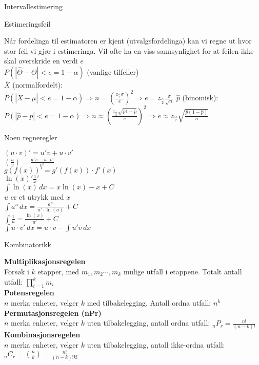 \documentclass[final,hyperref={pdfpagelabels=false}]{beamer}
\newcommand{\body}[1]{\footnotesize\raggedright{#1}\par}
\newcommand{\subsect}[1]{\center\normalsize{#1}\\}
\begin{document}
\begin{frame}{}
\begin{columns}[t]
\begin{column}{.25\linewidth}
\begin{block}{\center Intervallestimering}
{\begin{enumerate}
					\end{enumerate}
				}
				\subsect{Estimeringsfeil}
				\body{Når fordelinga til estimatoren er kjent (utvalgsfordelinga) kan vi regne ut hvor stor feil vi gjør i estimeringa. Vil ofte ha en viss sannsynlighet for at feilen ikke skal overskride en verdi $e$\\
					$P(|\hat\Theta-\Theta|<e=1-\alpha)$ (vanlige tilfeller)\\
					$\bar X$ (normalfordelt):\\
					$P(|\bar X - \mu|<e=1-\alpha) \Rightarrow n=\left( \frac{z_\frac{\alpha}{2}\sigma}{e}\right)^2\Rightarrow e=z_\frac{\alpha}{2}\frac{\sigma}{\sqrt n}$
					$\hat p$ (binomisk):\\
					$P(|\hat p - p| < e=1-\alpha)\Rightarrow n\approx \left(\frac{z_\frac{\alpha}{2}\sqrt{\hat p {1-\hat p}}}{e}\right)^2\Rightarrow e\approx z_\frac{\alpha}{2}\sqrt{\frac{\hat p(1 - \hat p)}{n}}$}
				\subsect{Noen regneregler}
				\body{
					$(u\cdot v)' = u'v + u\cdot v'$\\
					$\left( \frac{u}{v}\right) = \frac{u'v - u\cdot v'}{v^2}$\\
					$g(f(x))'=g'(f(x))\cdot f'(x)$\\
					$\ln(x)'\frac{1}{x}'$\\
					$\int \ln (x) \, dx=x\ln (x) -x + C$ \\
					$u$ er et utrykk med $x$\\
					$\int a^u \, dx = \frac{a^u}{u'\cdot \ln(a)} + C$\\
					$\int \frac{1}{u} = \frac{\ln(x)}{u'} + C$ \\
					$\int u \cdot v' \, dx = u\cdot v-\int u'v \, dx$
				}
				\subsect{Kombinatorikk}
				\body{\textbf{Multiplikasjonsregelen}\\
					Forsøk i $k$ etapper, med $m_1,m_2 \cdots,m_k$ mulige utfall i etappene. Totalt antall utfall: $\prod_{i=1}^k m_i$\\
					\textbf{Potensregelen}\\
					$n$ merka enheter, velger $k$ med tilbakelegging. Antall ordna utfall: $n^k$\\
					\textbf{Permutasjonsregelen (nPr)}\\
					$n$ merka enheter, velger $k$ uten tilbakelegging, antall ordna utfall: $_nP_r=\frac{n!}{(n-k)!}$\\
					\textbf{Kombinasjonsregelen}\\
					$n$ merka enheter, velger $k$ uten tilbakelegging, antall ikke-ordna utfall: $_nC_r=\binom{n}{k}=\frac{n!}{(n-k)!k!}$\\}

\end{block}
\end{column}
\end{columns}
\end{frame}
\end{document}
